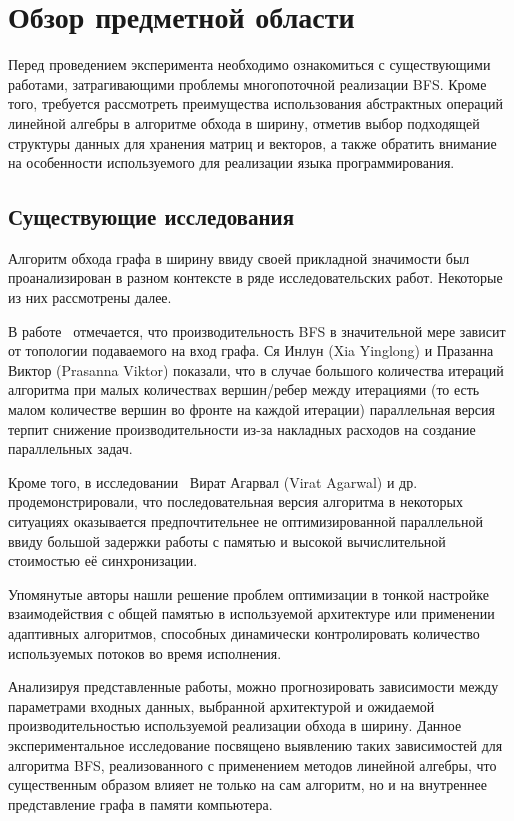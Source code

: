 
\section{Обзор предметной области}
\label{sec:relatedworks}
\noindent Перед проведением эксперимента необходимо ознакомиться с существующими работами, затрагивающими проблемы многопоточной реализации BFS. Кроме того, требуется рассмотреть преимущества использования абстрактных операций линейной алгебры в алгоритме обхода в ширину, отметив выбор подходящей структуры данных для хранения матриц и векторов, а также обратить внимание на особенности используемого для реализации языка программирования.

\subsection{Существующие исследования}
Алгоритм обхода графа в ширину ввиду своей прикладной значимости был проанализирован в разном контексте в ряде исследовательских работ. Некоторые из них рассмотрены далее.

В работе~\cite{adaptiveBFS} отмечается, что производительность BFS в значительной мере зависит от топологии подаваемого на вход графа. Ся Инлун (Xia Yinglong) и Празанна Виктор (Prasanna Viktor) показали, что в случае большого количества итераций алгоритма при малых количествах вершин/ребер между итерациями (то есть малом количестве вершин во фронте на каждой итерации) параллельная версия терпит снижение производительности из-за накладных расходов на создание параллельных задач.

Кроме того, в исследовании~\cite{scalableBFS} Вират Агарвал (Virat Agarwal) и др. продемонстрировали, что последовательная версия алгоритма в некоторых ситуациях оказывается предпочтительнее не оптимизированной параллельной ввиду большой задержки работы с памятью и высокой вычислительной стоимостью её синхронизации.

Упомянутые авторы нашли решение проблем оптимизации в тонкой настройке взаимодействия с общей памятью в используемой архитектуре или применении адаптивных алгоритмов, способных динамически контролировать количество используемых потоков во время исполнения.

Анализируя представленные работы, можно прогнозировать зависимости между параметрами входных данных, выбранной архитектурой и ожидаемой производительностью используемой реализации обхода в ширину. Данное экспериментальное исследование посвящено выявлению таких зависимостей для алгоритма BFS, реализованного с применением методов линейной алгебры, что существенным образом влияет не только на сам алгоритм, но и на внутреннее представление графа в памяти компьютера.


